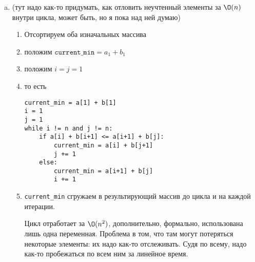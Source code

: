 \begin{solution}
\begin{enumerate}[a)]
    \item (тут надо как-то придумать, как отловить неучтенный элементы за $\O(n)$ внутри цикла, может быть, но я пока над ней думаю)
    \begin{enumerate}[1.]
        \item Отсортируем оба изначальных массива
        \item положим $\texttt{current\_min}=a_1 + b_1$
        \item положим $i=j=1$
        \item то есть
        \begin{lstlisting}
current_min = a[1] + b[1]
i = 1
j = 1
while i != n and j != n:
    if a[i] + b[i+1] <= a[i+1] + b[j]:
        current_min = a[i] + b[j+1]
        j += 1
    else:
        current_min = a[i+1] + b[j]
        i += 1
        \end{lstlisting}
        \item \texttt{current\_min} сгружаем в результирующий массив до цикла и на каждой итерации.
        \begin{remark}
            Цикл отработает за $\O(n^2)$, дополнительно, формально, использована лишь одна переменная. Проблема в том, что там могут потеряться некоторые элементы: их надо как-то отслеживать. Судя по всему, надо как-то пробежаться по всем ним за линейное время.
        \end{remark}
    \end{enumerate}
\end{enumerate}
\end{solution}